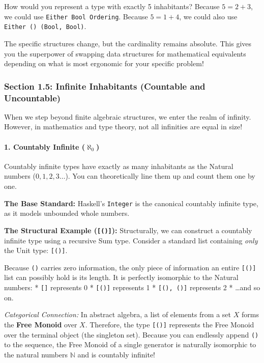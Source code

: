 \documentclass[
]{article}
\begin{document}
How would you represent a type with exactly 5 inhabitants? Because
\(5 = 2 + 3\), we could use \texttt{Either\ Bool\ Ordering}. Because
\(5 = 1 + 4\), we could also use \texttt{Either\ ()\ (Bool,\ Bool)}.

The specific structures change, but the cardinality remains absolute.
This gives you the superpower of swapping data structures for
mathematical equivalents depending on what is most ergonomic for your
specific problem!

\subsubsection{Section 1.5: Infinite Inhabitants (Countable and
Uncountable)}\label{section-1.5-infinite-inhabitants-countable-and-uncountable}

When we step beyond finite algebraic structures, we enter the realm of
infinity. However, in mathematics and type theory, not all infinities
are equal in size!

\paragraph{\texorpdfstring{1. Countably Infinite
(\(\aleph_0\))}{1. Countably Infinite (\textbackslash aleph\_0)}}\label{countably-infinite-aleph_0}

Countably infinite types have exactly as many inhabitants as the Natural
numbers (\(0, 1, 2, 3\dots\)). You can theoretically line them up and
count them one by one.

\textbf{The Base Standard:} Haskell's \texttt{Integer} is the canonical
countably infinite type, as it models unbounded whole numbers.

\textbf{The Structural Example (\texttt{{[}(){]}}):} Structurally, we
can construct a countably infinite type using a recursive Sum type.
Consider a standard list containing \emph{only} the Unit type:
\texttt{{[}(){]}}.

Because \texttt{()} carries zero information, the only piece of
information an entire \texttt{{[}(){]}} list can possibly hold is its
length. It is perfectly isomorphic to the Natural numbers: *
\texttt{{[}{]}} represents 0 * \texttt{{[}(){]}} represents 1 *
\texttt{{[}(),\ (){]}} represents 2 * \ldots and so on.

\emph{Categorical Connection:} In abstract algebra, a list of elements
from a set \(X\) forms the \textbf{Free Monoid} over \(X\). Therefore,
the type \texttt{{[}(){]}} represents the Free Monoid over the terminal
object (the singleton set). Because you can endlessly append \texttt{()}
to the sequence, the Free Monoid of a single generator is naturally
isomorphic to the natural numbers \(\mathbb{N}\) and is countably
infinite!
\end{document}
